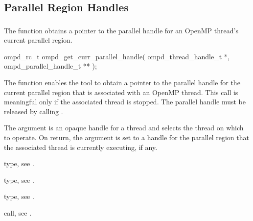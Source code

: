 \subsection{Parallel Region Handles}

\subsubsection{}
\label{subsubsubsec:ompd_get_curr_parallel_handle}
\summary
The   function obtains a pointer 
to the parallel handle for an OpenMP thread's current parallel region.

\format
\begin{cspecific}
\begin{ompSyntax}
ompd_rc_t ompd_get_curr_parallel_handle(
  ompd_thread_handle_t *,
  ompd_parallel_handle_t **
);
\end{ompSyntax}
\end{cspecific}

\descr
The   function enables the tool 
to obtain a pointer to the parallel handle for the current parallel region 
that is associated with an OpenMP thread. This call is meaningful only if 
the associated thread is stopped. The parallel handle must be released by 
calling .

\argdesc
The  argument is an opaque handle for a thread and selects 
the thread on which to operate. On return, the  
argument is set to a handle for the parallel region that the associated thread 
is currently executing, if any.

\begin{crossrefs}
\item {} type, 
see .

\item {} type, 
see .

\item {} type, see .

\item {} call, 
see .
\end{crossrefs}



